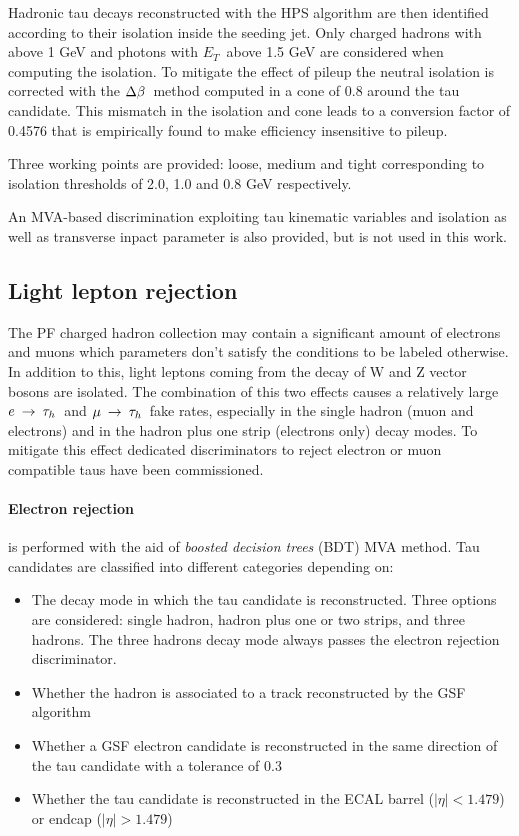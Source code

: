 Hadronic tau decays reconstructed with the HPS algorithm are then identified according to their isolation inside the seeding jet. Only charged hadrons with \pT above 1 GeV and photons with $E_T$\ above 1.5 GeV are considered when computing the isolation. To mitigate the effect of pileup the neutral isolation is corrected with the $\Delta\beta$\ method computed in a \DR cone of 0.8 around the tau candidate. This mismatch in the isolation and \db cone leads to a conversion factor of 0.4576 that is empirically found to make efficiency insensitive to pileup.

Three working points are provided: loose, medium and tight corresponding to isolation thresholds of 2.0, 1.0 and 0.8 GeV respectively.

An MVA-based discrimination exploiting tau kinematic variables and isolation as well as transverse inpact parameter is also provided, but is not used in this work.

\subsection{Light lepton rejection}

The PF charged hadron collection may contain a significant amount of electrons and muons which parameters don't satisfy the conditions to be labeled otherwise. In addition to this, light leptons coming from the decay of W and Z vector bosons are isolated. The combination of this two effects causes a relatively large $e\:\rightarrow\:\tau_h$\ and $\mu\:\rightarrow\:\tau_h$\ fake rates, especially in the single hadron (muon and electrons) and in the hadron plus one strip (electrons only) decay modes. To mitigate this effect dedicated discriminators to reject electron or muon compatible taus have been commissioned.

\paragraph{Electron rejection} is performed with the aid of \emph{boosted decision trees} (BDT) MVA method. Tau candidates are classified into different categories depending on:

\begin{itemize}
\item The decay mode in which the tau candidate is reconstructed. Three options are considered: single hadron, hadron plus one or two strips, and three hadrons. The three hadrons decay mode always passes the electron rejection discriminator.
\item Whether the hadron is associated to a track reconstructed by the GSF algorithm
\item Whether a GSF electron candidate is reconstructed in the same direction of the tau candidate with a \DR tolerance of 0.3
\item Whether the tau candidate is reconstructed in the ECAL barrel ($|\eta| < 1.479$) or endcap ($|\eta| > 1.479$)
\end{itemize}

